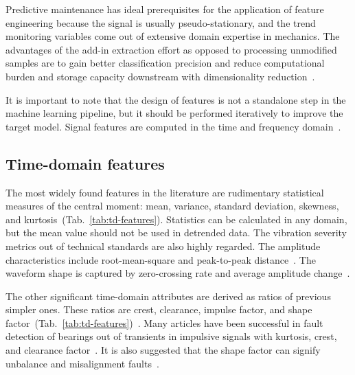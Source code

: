 Predictive maintenance has ideal prerequisites for the application of feature engineering because the signal is usually pseudo-stationary, and the trend monitoring variables come out of extensive domain expertise in mechanics. The advantages of the add-in extraction effort as opposed to processing unmodified samples are to gain better classification precision and reduce computational burden and storage capacity downstream with dimensionality reduction~\cite{johnson_feature_2019}.

It is important to note that the design of features is not a standalone step in the machine learning pipeline, but it should be performed iteratively to improve the target model. Signal features are computed in the time and frequency domain~\cite{brito_fault_2021}.

\subsection{Time-domain features}
The most widely found features in the literature are rudimentary statistical measures of the central moment: mean, variance, standard deviation, skewness, and kurtosis~(Tab.~\ref{tab:td-features}). Statistics can be calculated in any domain, but the mean value should not be used in detrended data. The vibration severity metrics out of technical standards are also highly regarded. The amplitude characteristics include root-mean-square and peak-to-peak distance~\cite{mostafavi_novel_2021}. The waveform shape is captured by zero-crossing rate and average amplitude change~\cite{moctar_time-domain_2023}.

The other significant time-domain attributes are derived as ratios of previous simpler ones. These ratios are crest, clearance, impulse factor, and shape factor~(Tab.~\ref{tab:td-features})~\cite{nandi_condition_2019}. Many articles have been successful in fault detection of bearings out of transients in impulsive signals with kurtosis, crest, and clearance factor~\cite{brito_fault_2021}. It is also suggested that the shape factor can signify unbalance and misalignment faults~\cite{nandi_condition_2019}.

